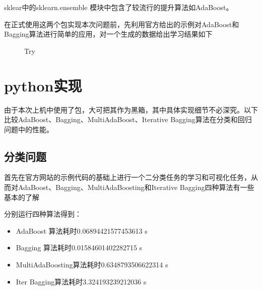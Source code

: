 \documentclass[UTF8]{ctexart}
\begin{document}
sklear中的sklearn.ensemble 模块中包含了较流行的提升算法如AdaBoost。

在正式使用这两个包实现本次问题前，先利用官方给出的示例对AdaBoost和Bagging算法进行简单的应用，对一个生成的数据给出学习结果如下

\begin{figure}[htbp]
	\centering
	\quad
	\caption{Try}
\end{figure}
\newpage
\section{python实现}
由于本次上机中使用了包，大可把其作为黑箱，其中具体实现细节不必深究。以下比较AdaBoost、Bagging、MultiAdaBoost、Iterative Bagging算法在分类和回归问题中的性能。

\subsection{分类问题}
首先在官方网站的示例代码的基础上进行一个二分类任务的学习和可视化任务，从而对AdaBoost、Bagging、MultiAdaBoosting和Iterative Bagging四种算法有一些基本的了解

分别运行四种算法得到：
\begin{itemize}
	\item
	AdaBoost 算法耗时0.06894421577453613 s
	\item
	Bagging 算法耗时0.01584601402282715 s
	\item
	MultiAdaBoosting算法耗时0.6348793506622314 s
	\item
	Iter Bagging算法耗时3.324193239212036 s
\end{itemize}
\end{document}
